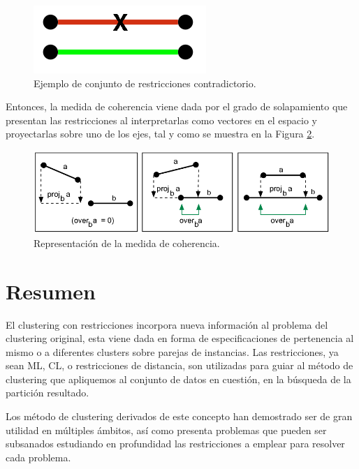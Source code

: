\begin{figure}[!h]
	\centering
	\includegraphics[scale=0.4]{imagenes/c3/Coherencia/Coher1}
	\caption[Ejemplo de conjunto de restricciones contradictorio.]{Ejemplo de conjunto de restricciones contradictorio. \cite{Survey:2007}}\label{fig:figure17}
\end{figure}

Entonces, la medida de coherencia viene dada por el grado de solapamiento que presentan las restricciones al interpretarlas como vectores en el espacio y proyectarlas sobre uno de los ejes, tal y como se muestra en la Figura \ref{fig:figure18}.

\begin{figure}[!h]
	\centering
	\includegraphics[scale=0.4]{imagenes/c3/Coherencia/Coher2}
	\caption[Representación de la medida de coherencia.]{Representación de la medida de coherencia. \cite{Survey:2007}}\label{fig:figure18}
\end{figure}

\section{Resumen}

El clustering con restricciones incorpora nueva información al problema del clustering original, esta viene dada en forma de especificaciones de pertenencia al mismo o a diferentes clusters sobre parejas de instancias. Las restricciones, ya sean \acf{ML}, \acf{CL}, o restricciones de distancia, son utilizadas para guiar al método de clustering que apliquemos al conjunto de datos en cuestión, en la búsqueda de la partición resultado.

Los método de clustering derivados de este concepto han demostrado ser de gran utilidad en múltiples ámbitos, así como presenta problemas que pueden ser subsanados estudiando en profundidad las restricciones a emplear para resolver cada problema.


































